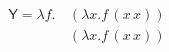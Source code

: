 \documentclass{article}
\begin{document}
\begin{align*}
  \textsf{Y} = \lambda f.\,&(\lambda x.f\,(x\, x)) \\
                   \,&(\lambda x.f\,(x\, x))
\end{align*}
\end{document}
